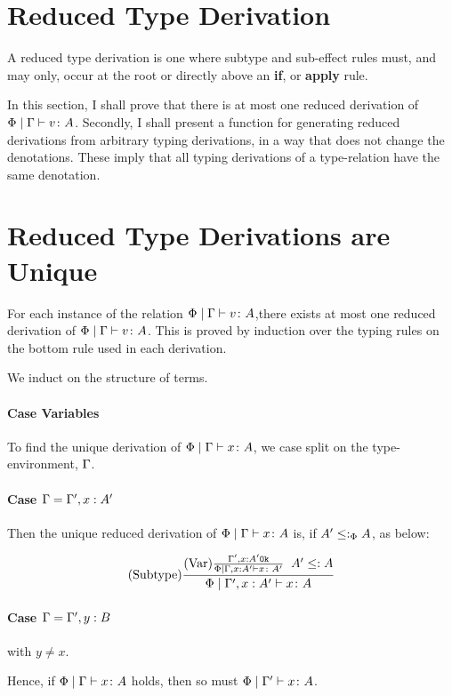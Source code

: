 \documentclass{report}
\begin{document}
\section{Reduced Type Derivation}
A reduced type derivation is one where subtype and sub-effect rules must, and may only, occur at the root or directly above an \textbf{if}, or \textbf{apply} rule.

In this section, I shall prove that there is at most one reduced derivation of $\Phi\mid\Gamma \vdash v \colon A$. Secondly, I shall present a function for generating reduced derivations from arbitrary typing derivations, in a way that does not change the denotations. These imply that all typing derivations of a type-relation have the same denotation.

\section{Reduced Type Derivations are Unique}
For each instance of the relation $\Phi\mid\Gamma \vdash v \colon A$,there exists at most one reduced derivation of  $\Phi\mid\Gamma \vdash v \colon A$. This is proved by induction over the typing rules on the bottom rule used in each derivation.

\proof
We induct on the structure of terms.

\paragraph{Case Variables}
To find the unique derivation of $\Phi\mid\Gamma \vdash x \colon A$, we case split on the type-environment, $\Gamma$.

\paragraph{Case $\Gamma = \Gamma', x: A'$}
Then the unique reduced derivation of $\Phi\mid\Gamma \vdash x \colon A$ is, if $A' \leq:_\Phi A$, as below:

\begin{equation}
    (\text{Subtype}) \frac{(\text{Var}) \frac{\Gamma', x: A' \texttt{Ok}}{\Phi\mid\Gamma,x: A' \vdash x \colon A'}\;\; A' \leq: A}{\Phi\mid\Gamma', x: A' \vdash x \colon A}
\end{equation}

\paragraph{Case $\Gamma = \Gamma', y: B$} with $y \neq x$.

Hence, if $\Phi\mid\Gamma \vdash x \colon A$ holds, then so must $\Phi\mid\Gamma' \vdash x \colon A$.
\end{document}
